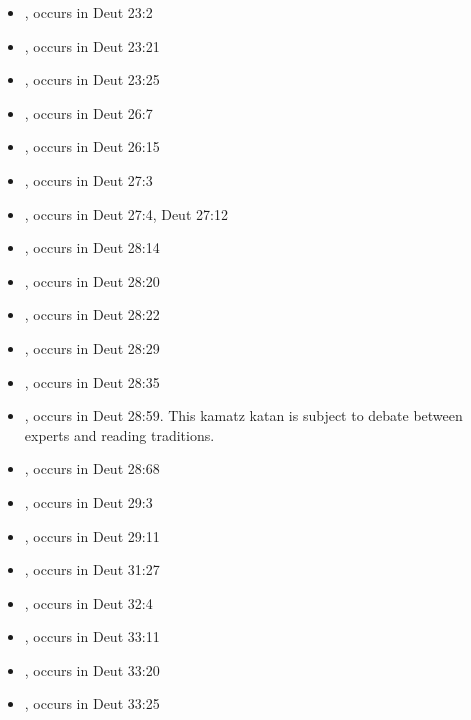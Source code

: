 \documentclass[14pt]{article}
\begin{document}
\begin{itemize}
\item {}, occurs in Deut 23:2

\item {}, occurs in Deut 23:21

\item {}, occurs in Deut 23:25

\item {}, occurs in Deut 26:7

\item {}, occurs in Deut 26:15

\item {}, occurs in Deut 27:3

\item {}, occurs in Deut 27:4, Deut 27:12

\item {}, occurs in Deut 28:14

\item {}, occurs in Deut 28:20

\item {}, occurs in Deut 28:22

\item {}, occurs in Deut 28:29

\item {}, occurs in Deut 28:35

\item {}, occurs in Deut 28:59. This kamatz katan is subject to debate between experts and reading traditions.

\item {}, occurs in Deut 28:68

\item {}, occurs in Deut 29:3

\item {}, occurs in Deut 29:11

\item {}, occurs in Deut 31:27

\item {}, occurs in Deut 32:4

\item {}, occurs in Deut 33:11

\item {}, occurs in Deut 33:20

\item {}, occurs in Deut 33:25

\end{itemize}
\end{document}
